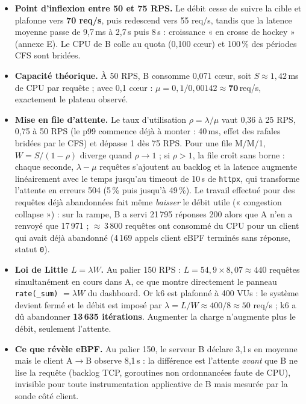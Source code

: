 \documentclass[10pt,a4paper]{article}
\newcommand{\code}[1]{\texttt{\small #1}}
\begin{document}
\begin{itemize}
  \item \textbf{Point d'inflexion entre 50 et 75 RPS.} Le débit cesse de suivre la cible et plafonne vers \textbf{70 req/s}, puis redescend vers 55 req/s, tandis que la latence moyenne passe de 9,7\,ms à 2,7\,s puis 8\,s : croissance « en crosse de hockey » (annexe E). Le CPU de B colle au quota (0,100 cœur) et 100\,\% des périodes CFS sont bridées.
  \item \textbf{Capacité théorique.} À 50 RPS, B consomme 0,071 cœur, soit $S\approx1{,}42$\,ms de CPU par requête ; avec 0,1 cœur : $\mu = 0{,}1/0{,}00142 \approx \mathbf{70}$\,req/s, exactement le plateau observé.
  \item \textbf{Mise en file d'attente.} Le taux d'utilisation $\rho=\lambda/\mu$ vaut 0,36 à 25 RPS, 0,75 à 50 RPS (le p99 commence déjà à monter : 40\,ms, effet des rafales bridées par le CFS) et dépasse 1 dès 75 RPS. Pour une file M/M/1, $W = S/(1-\rho)$ diverge quand $\rho\rightarrow1$ ; si $\rho>1$, la file croît sans borne : chaque seconde, $\lambda-\mu$ requêtes s'ajoutent au backlog et la latence augmente linéairement avec le temps jusqu'au timeout de 10\,s de \code{httpx}, qui transforme l'attente en erreurs 504 (5\,\% puis jusqu'à 49\,\%). Le travail effectué pour des requêtes déjà abandonnées fait même \emph{baisser} le débit utile (« congestion collapse ») : sur la rampe, B a servi 21\,795 réponses 200 alors que A n'en a renvoyé que 17\,971 ; $\approx$\,3\,800 requêtes ont consommé du CPU pour un client qui avait déjà abandonné (4\,169 appels client eBPF terminés sans réponse, statut \code{0}).
  \item \textbf{Loi de Little $L=\lambda W$.} Au palier 150 RPS : $L = 54{,}9 \times 8{,}07 \approx 440$ requêtes simultanément en cours dans A, ce que montre directement le panneau \code{rate(\_sum)} $=\lambda W$ du dashboard. Or k6 est plafonné à 400 VUs : le système devient fermé et le débit est imposé par $\lambda = L/W \approx 400/8 \approx 50$ req/s ; k6 a dû abandonner \textbf{13\,635 itérations}. Augmenter la charge n'augmente plus le débit, seulement l'attente.
  \item \textbf{Ce que révèle eBPF.} Au palier 150, le serveur B déclare 3,1\,s en moyenne mais le client A$\rightarrow$B observe 8,1\,s : la différence est l'attente \emph{avant} que B ne lise la requête (backlog TCP, goroutines non ordonnancées faute de CPU), invisible pour toute instrumentation applicative de B mais mesurée par la sonde côté client.
\end{itemize}
\end{document}
